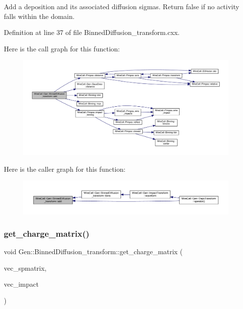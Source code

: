 Add a deposition and its associated diffusion sigmas. Return false if no activity falls within the domain. 

Definition at line 37 of file Binned\+Diffusion\+\_\+transform.\+cxx.

Here is the call graph for this function\+:
\nopagebreak
\begin{figure}[H]
\begin{center}
\leavevmode
\includegraphics[width=350pt]{class_wire_cell_1_1_gen_1_1_binned_diffusion__transform_a18fd9a41fa313057caf57a8aa9957c86_cgraph}
\end{center}
\end{figure}
Here is the caller graph for this function\+:
\nopagebreak
\begin{figure}[H]
\begin{center}
\leavevmode
\includegraphics[width=350pt]{class_wire_cell_1_1_gen_1_1_binned_diffusion__transform_a18fd9a41fa313057caf57a8aa9957c86_icgraph}
\end{center}
\end{figure}
\mbox{\label{class_wire_cell_1_1_gen_1_1_binned_diffusion__transform_a7baeb40d106e11019f0cf96917a59d18}} 
\subsubsection{\texorpdfstring{get\+\_\+charge\+\_\+matrix()}{get\_charge\_matrix()}}
{\footnotesize\ttfamily void Gen\+::\+Binned\+Diffusion\+\_\+transform\+::get\+\_\+charge\+\_\+matrix (\begin{DoxyParamCaption}\item[{std\+::vector$<$ Eigen\+::\+Sparse\+Matrix$<$ float $>$ $\ast$ $>$ \&}]{vec\+\_\+spmatrix,  }\item[{std\+::vector$<$ int $>$ \&}]{vec\+\_\+impact }\end{DoxyParamCaption})}



